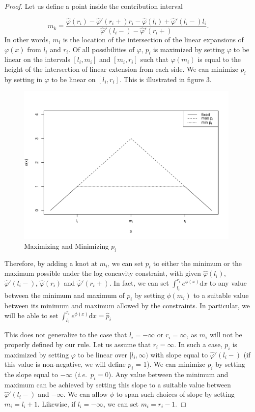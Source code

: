 \documentclass[10pt]{article}
\begin{document}
\begin{proof}
	  Let us define a point inside the contribution interval 	
	
	\[ m_k = \frac{\hat \varphi(r_i) - \hat \varphi'(r_i + ) r_i - \hat \varphi(l_i) + \hat \varphi'(l_i - ) l_i} {\hat \varphi'(l_i - ) - \hat \varphi'(r_i + )}.
	\]		
	In other words, $m_i$ is the location of the intersection of the linear expansions of $\varphi(x)$ from $l_i$ and $r_i$. Of all possibilities of $\varphi$, $p_i$ is maximized by setting $\varphi$ to be linear on the intervals $[l_i, m_i]$ and $[m_i, r_i]$ such that $\varphi(m_i)$ is equal to the height of the intersection of linear extension from each side. We can minimize $p_i$ by setting in $\varphi$ to be linear on $[l_i, r_i]$. This is illustrated in figure 3. 

	\begin{figure}[h]
\centerline{\includegraphics[width = 11cm]{maxminpk.pdf}}
\caption{Maximizing and Minimizing $p_i$}
\end{figure}		

	Therefore, by adding a knot at $m_i$, we can set $p_i$ to either the minimum or the maximum possible under the log concavity constraint, with given $\hat \varphi(l_i)$, $\hat \varphi'(l_i -)$, $\hat \varphi(r_i)$ and $\hat \varphi'(r_i+)$. In fact, we can set $\displaystyle \int_{l_i}^{r_i} e^{\phi(x)} \mathrm{d}x$ to any value between the minimum and maximum of $p_i$ by setting $\phi(m_i)$ to a suitable value between its minimum and maximum allowed by the constraints. In particular, we will be able to set $\displaystyle \int_{l_i}^{r_i} e^{\phi(x)} \mathrm{d}x = \hat p_i$ 

	This does not generalize to the case that $l_i = -\infty$ or $r_i = \infty$, as $m_i$ will not be properly defined by our rule. Let us assume that $r_i = \infty$. In such a case, $p_i$ is maximized by setting $\varphi$ to be linear over $[l_i, \infty)$ with slope equal to $\hat\varphi '(l_i-)$ (if this value is non-negative, we will define $p_i$ = 1). We can minimize $p_i$ by setting the slope equal to $-\infty$ (\emph{i.e.}\ $p_i = 0$). Any value between the minimum and maximum can be achieved by setting this slope to a suitable value between $\hat\varphi '(l_i-)$ and $-\infty$. We can allow $\phi$ to span such choices of slope by setting $m_i = l_i + 1$. Likewise, if $l_i = -\infty$, we can set $m_i = r_i - 1$. 


\end{proof}
\end{document}

